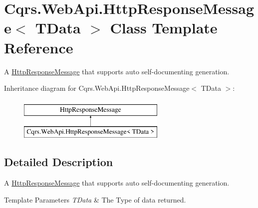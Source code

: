 \hypertarget{classCqrs_1_1WebApi_1_1HttpResponseMessage}{}\section{Cqrs.\+Web\+Api.\+Http\+Response\+Message$<$ T\+Data $>$ Class Template Reference}
\label{classCqrs_1_1WebApi_1_1HttpResponseMessage}


A \hyperlink{classCqrs_1_1WebApi_1_1HttpResponseMessage}{Http\+Response\+Message} that supports auto self-\/documenting generation.  


Inheritance diagram for Cqrs.\+Web\+Api.\+Http\+Response\+Message$<$ T\+Data $>$\+:\begin{figure}[H]
\begin{center}
\leavevmode
\includegraphics[height=2.000000cm]{classCqrs_1_1WebApi_1_1HttpResponseMessage}
\end{center}
\end{figure}


\subsection{Detailed Description}
A \hyperlink{classCqrs_1_1WebApi_1_1HttpResponseMessage}{Http\+Response\+Message} that supports auto self-\/documenting generation. 


\begin{DoxyTemplParams}{Template Parameters}
{\em T\+Data} & The Type of data returned.\\
\hline
\end{DoxyTemplParams}
